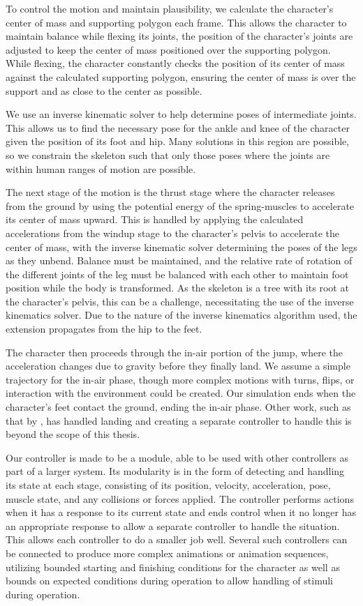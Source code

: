 To control the motion and maintain plausibility, we calculate the character's center of mass and supporting polygon each frame.  This allows the character to maintain balance while flexing its joints, the position of the character's joints are adjusted to keep the center of mass positioned over the supporting polygon.  While flexing, the character constantly checks the position of its center of mass against the calculated supporting polygon, ensuring the center of mass is over the support and as close to the center as possible.

We use an inverse kinematic solver to help determine poses of intermediate joints.  This allows us to find the necessary pose for the ankle and knee of the character given the position of its foot and hip.  Many solutions in this region are possible, so we constrain the skeleton such that only those poses where the joints are within human ranges of motion are possible.

The next stage of the motion is the thrust stage where the character releases from the ground by using the potential energy of the spring-muscles to accelerate its center of mass upward.  This is handled by applying the calculated accelerations from the windup stage to the character's pelvis to accelerate the center of mass, with the inverse kinematic solver determining the poses of the legs as they unbend.  Balance must be maintained, and the relative rate of rotation of the different joints of the leg must be balanced with each other to maintain foot position while the body is transformed.  As the skeleton is a tree with its root at the character's pelvis, this can be a challenge, necessitating the use of the inverse kinematics solver.  Due to the nature of the inverse kinematics algorithm used, the extension propagates from the hip to the feet.  

The character then proceeds through the in-air portion of the jump, where the acceleration changes due to gravity before they finally land.  We assume a simple trajectory for the in-air phase, though more complex motions with turns, flips, or interaction with the environment could be created.  Our simulation ends when the character's feet contact the ground, ending the in-air phase.  Other work, such as that by \liufall, has handled landing and creating a separate controller to handle this is beyond the scope of this thesis. \cite{falling_landing}

Our controller is made to be a module, able to be used with other controllers as part of a larger system.  Its modularity is in the form of detecting and handling its state at each stage, consisting of its position, velocity, acceleration, pose, muscle state, and any collisions or forces applied. The controller performs actions when it has a response to its current state and ends control when it no longer has an appropriate response to allow a separate controller to handle the situation.  This allows each controller to do a smaller job well. Several such controllers can be connected to produce more complex animations or animation sequences, utilizing bounded starting and finishing conditions for the character as well as bounds on expected conditions during operation to allow handling of stimuli during operation.

